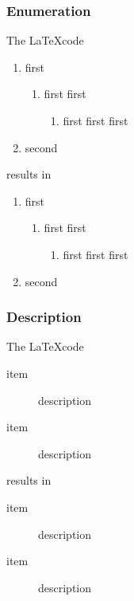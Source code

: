 \documentclass[report,english]{enacom}
\begin{document}
\subsubsection{Enumeration}
	The \LaTeX code
    \begin{lcode}
	\begin{enumerate}
    	\item first
    	\begin{enumerate}
    		\item first first
			\begin{enumerate}
				\item first first first
			\end{enumerate}
		\end{enumerate}
		\item second
	\end{enumerate} 
    \end{lcode}
	results in
	\begin{enumerate}
    \item first
    \begin{enumerate}
    \item first first
    \begin{enumerate}
				\item first first first
			\end{enumerate}
		\end{enumerate}
		\item second
	\end{enumerate}

\subsubsection{Description}
    The \LaTeX code
        \begin{lcode}
        \begin{description}
            \item [item] description
            \item [item] description
        \end{description}
        \end{lcode}
        results in
    \begin{description}
        \item[item] description
        \item[item] description
    \end{description}
\end{document}
